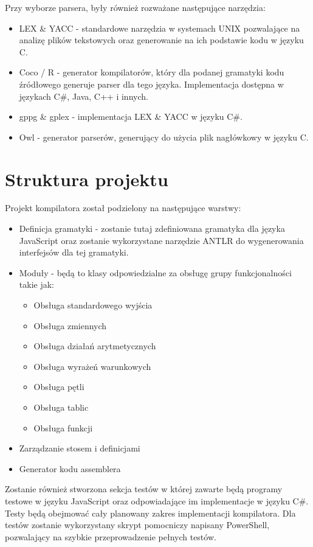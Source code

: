 \par Przy wyborze parsera, były również rozważane następujące narzędzia:
\begin{itemize}
  \item LEX \& YACC - standardowe narzędzia w systemach UNIX pozwalające na analizę plików tekstowych oraz generowanie na ich podstawie kodu w języku C.
  \item Coco / R - generator kompilatorów, który dla podanej gramatyki kodu źródłowego generuje parser dla tego języka. Implementacja dostępna w językach C\#, Java, C++ i innych.
  \item gppg \& gplex - implementacja LEX \& YACC w języku C\#.
  \item Owl - generator parserów, generujący do użycia plik nagłówkowy w języku C.
\end{itemize}



\section{Struktura projektu}

\par Projekt kompilatora został podzielony na następujące warstwy:
\begin{itemize}
  \item Definicja gramatyki - zostanie tutaj zdefiniowana gramatyka dla języka JavaScript oraz zostanie wykorzystane narzędzie ANTLR do wygenerowania interfejsów dla tej gramatyki.
  \item Moduły - będą to klasy odpowiedzialne za obsługę grupy funkcjonalności takie jak:
  \begin{itemize}
    \item Obsługa standardowego wyjścia
    \item Obsługa zmiennych
    \item Obsługa działań arytmetycznych
    \item Obsługa wyrażeń warunkowych
    \item Obsługa pętli
    \item Obsługa tablic
    \item Obsługa funkcji
  \end{itemize}
  \item Zarządzanie stosem i definicjami
  \item Generator kodu assemblera
\end{itemize}

\par Zostanie również stworzona sekcja testów w której zawarte będą programy testowe w języku JavaScript oraz odpowiadające im implementacje w języku C\#. Testy będą obejmować cały planowany zakres implementacji kompilatora. Dla testów zostanie wykorzystany skrypt pomocniczy napisany PowerShell, pozwalający na szybkie przeprowadzenie pełnych testów.
